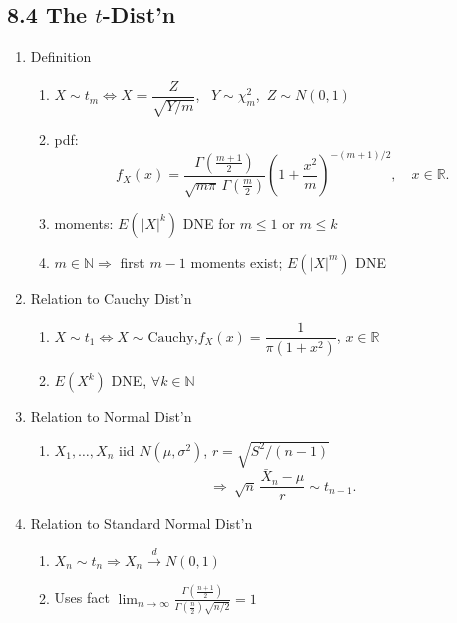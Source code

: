 \documentclass[11pt]{article}
\begin{document}
\subsection*{8.4 The $t$-Dist'n}
\begin{enumerate}[label=\Roman*.]
  \item Definition
  \begin{enumerate}[label=\Alph*.]
    \item $X\sim t_{m}\iff X=\dfrac{Z}{\sqrt{Y/m}}$, \ $Y\sim\chi^{2}_{m}$,\ $Z\sim N(0,1)$
    \item pdf:
    \[
      f_{X}(x)=\frac{\Gamma\left(\frac{m+1}{2}\right)}{\sqrt{m\pi}\,\Gamma\left(\frac{m}{2}\right)}
      \left(1+\frac{x^{2}}{m}\right)^{-(m+1)/2},\quad x\in\mathbb{R}.
    \]
    \item moments: $E(|X|^{k})$ DNE for $m\le 1$ or $m\le k$
    \item $m\in\mathbb{N}\Rightarrow$ first $m-1$ moments exist; $E(|X|^{m})$ DNE
  \end{enumerate}
  \item Relation to Cauchy Dist'n
  \begin{enumerate}[label=\Alph*.]
    \item $X\sim t_{1}\iff X\sim\text{Cauchy}$,\quad $f_{X}(x)=\dfrac{1}{\pi(1+x^{2})}$, $x\in\mathbb{R}$
    \item $E(X^{k})$ DNE, $\forall k\in\mathbb{N}$
  \end{enumerate}
  \item Relation to Normal Dist'n
  \begin{enumerate}[label=\Alph*.]
    \item $X_{1},\dots,X_{n}$ iid $N(\mu,\sigma^{2})$, $r=\sqrt{S^{2}/(n-1)}$
    \[
      \Rightarrow\ \sqrt{n}\,\frac{\bar X_{n}-\mu}{r}\sim t_{n-1}.
    \]
  \end{enumerate}
  \item Relation to Standard Normal Dist'n
  \begin{enumerate}[label=\Alph*.]
    \item $X_{n}\sim t_{n}\Rightarrow X_{n}\xrightarrow{d}N(0,1)$
    \item Uses fact $\displaystyle \lim_{n\to\infty}\frac{\Gamma\left(\frac{n+1}{2}\right)}{\Gamma\left(\frac{n}{2}\right)\sqrt{n/2}}=1$
  \end{enumerate}
\end{enumerate}
\end{document}
